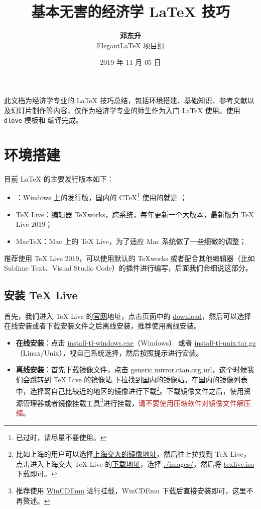 \documentclass[11pt,a4paper]{dlove}
\title{\bfseries 基本无害的经济学 \LaTeX{} 技巧}
\author{\href{https://ddswhu.me/}{\bfseries 邓东升} \\  Elegant\LaTeX{} 项目组}
\date{2019 年 11 月 05 日}
\begin{document}
\maketitle

此文档为经济学专业的 \LaTeX{} 技巧总结，包括环境搭建、基础知识、参考文献以及幻灯片制作等内容，仅作为经济学专业的师生作为入门 \LaTeX{} 使用。使用 \texttt{dlove} \heart{} 模板和  编译完成。

\section{环境搭建}
目前 \LaTeX{} 的主要发行版本如下：
\begin{itemize}
  \item {}：Windows 上的发行版，国内的 C\TeX{}\footnote{已过时，请尽量不要使用。} 使用的就是 ；
  \item \TeX{} Live：编辑器 \TeX{}works，跨系统，每年更新一个大版本，最新版为 TeX Live 2019；
  \item Mac\TeX{}：Mac 上的 \TeX{} Live，为了适应 Mac 系统做了一些细微的调整；
\end{itemize} 

推荐使用 \TeX{} Live 2019，可以使用默认的 \TeX{}works 或者配合其他编辑器（比如 Sublime Text、Visual Studio Code）的插件进行编写，后面我们会细说这部分。

\subsection{安装 \TeX{} Live}
首先，我们进入 \TeX{} Live 的\href{https://www.tug.org/texlive/}{官网}地址，点击页面中的 \href{https://www.tug.org/texlive/acquire-netinstall.html}{download}，然后可以选择在线安装或者下载安装文件之后离线安装，推荐使用离线安装。
\begin{itemize}
  \item \textbf{在线安装}：点击 \href{http://mirror.ctan.org/systems/texlive/tlnet/install-tl-windows.exe}{install-tl-windows.exe}（Windows） 或者 \href{http://mirror.ctan.org/systems/texlive/tlnet/install-tl-unx.tar.gz}{install-tl-unix.tar.gz}（Linux/Unix），视自己系统选择，然后按照提示进行安装。
  \item \textbf{离线安装}：首先下载镜像文件，点击 \href{https://ctan.org/mirrors}{generic mirror.ctan.org url}，这个时候我们会跳转到 \TeX{} Live 的\href{https://ctan.org/mirrors}{镜像站},下拉找到国内的镜像站。在国内的镜像列表中，选择离自己比较近的地区的镜像进行下载\footnote{比如上海的用户可以选择\href{https://mirrors.sjtug.sjtu.edu.cn/ctan/}{上海交大的镜像地址}，然后往上拉找到 \TeX{} Live，点击进入上海交大 \TeX{} Live 的\href{https://mirrors.sjtug.sjtu.edu.cn/ctan/systems/texlive/}{下载地址}，选择 \href{https://mirrors.sjtug.sjtu.edu.cn/ctan/systems/texlive/Images/}{./images/}，然后将 \href{https://mirrors.sjtug.sjtu.edu.cn/ctan/systems/texlive/Images/texlive.iso}{texlive.iso}下载即可。}。下载镜像文件之后，使用资源管理器或者镜像挂载工具\footnote{推荐使用 \href{http://wincdemu.sysprogs.org/}{WinCDEmu} 进行挂载，WinCDEmu 下载后直接安装即可，这里不再赘述。}进行挂载，\textsf{\textcolor{FireBrick}{请不要使用压缩软件对镜像文件解压缩}}。
\end{itemize}
\end{document}
